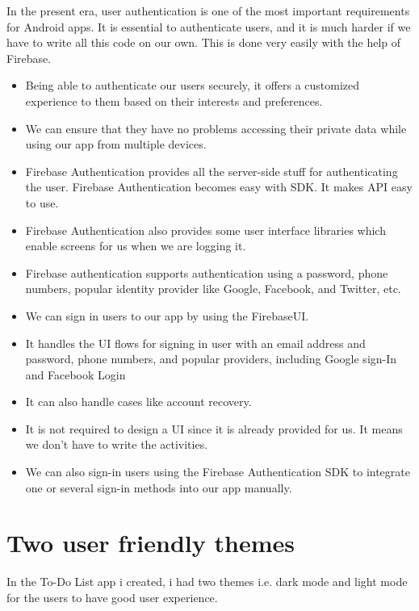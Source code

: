 In the present era, user authentication is one of the most important requirements for Android apps. It is essential to authenticate users, and it is much harder if we have to write all this code on our own. This is done very easily with the help of Firebase.
\begin{itemize}
\item Being able to authenticate our users securely, it offers a customized experience to them based on their interests and preferences.
\item We can ensure that they have no problems accessing their private data while using our app from multiple devices.
\item Firebase Authentication provides all the server-side stuff for authenticating the user. Firebase Authentication becomes easy with SDK. It makes API easy to use.
\item Firebase Authentication also provides some user interface libraries which enable screens for us when we are logging it.
\item Firebase authentication supports authentication using a password, phone numbers, popular identity provider like Google, Facebook, and Twitter, etc.
\item We can sign in users to our app by using the FirebaseUI.
\item It handles the UI flows for signing in user with an email address and password, phone numbers, and popular providers, including Google sign-In and Facebook Login
\item It can also handle cases like account recovery.
\item It is not required to design a UI since it is already provided for us. It means we don't have to write the activities.
\item We can also sign-in users using the Firebase Authentication SDK to integrate one or several sign-in methods into our app manually.

\end{itemize}
\newpage
\section{Two user friendly themes}
In the To-Do List app i created,  i had two themes i.e. dark mode and light mode for the users to have good user experience.

